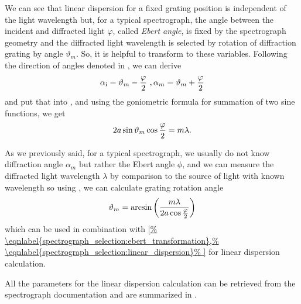 We can see that linear dispersion for a fixed grating position is independent
of the light wavelength but, for a typical spectrograph, the angle between the
incident and diffracted light $\varphi$, called \emph{Ebert angle}, is fixed by
the spectrograph geometry and the diffracted light wavelength is selected by
rotation of diffraction grating by angle $\vartheta_m$.
So, it is helpful to transform
to these variables.
Following the direction of angles denoted in
,
we can derive
\begin{equation}
	\alpha_\text{i} = \vartheta_m - \frac{\varphi}{2}\ ,
	\alpha_m = \vartheta_m + \frac{\varphi}{2}
	\label{\eqnlabel{spectrograph_selection:ebert_transformation}}
\end{equation}
and put that into
,
and using the goniometric formula for summation of two sine functions, we get
\begin{equation}
	2a\sin\vartheta_m\cos\frac{\varphi}{2} = m\lambda.
	\label{\eqnlabel{spectrograph_selection:grating_equation_ebert}}
\end{equation}

As we previously said, for a typical spectrograph, we usually do not know
diffraction angle $\alpha_m$ but rather the Ebert angle $\phi$, and we can
measure the diffracted light wavelength $\lambda$ by comparison to the source
of light with known wavelength so using
,
we can calculate grating rotation angle
\begin{equation}
	\vartheta_m = \text{arcsin}\left(
		\frac{m\lambda}{2a\cos\frac{\varphi}{2}}\right)
	\label{\eqnlabel{spectrograph_selection:grating_rotation_angle}}
\end{equation}
which can be used in combination with
\cref{%
	\eqnlabel{spectrograph_selection:ebert_transformation},%
	\eqnlabel{spectrograph_selection:linear_dispersion}%
}
for linear dispersion calculation.

All the parameters for the linear dispersion calculation can be retrieved from
the spectrograph documentation and are summarized in
.

\begin{table}
	\centering
	
	\caption[%
		Spectrograph and CCD parameters for dispersion calculation.%
	]{%
		All the values are taken from the spectrograph and CCD specification
		documents.
	}
	\label{\tablabel{spectrograph_selection:dispersion_params}}
\end{table}

